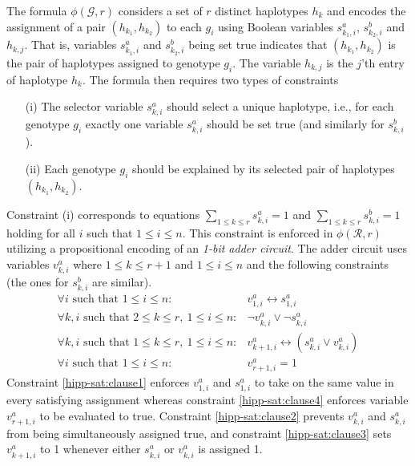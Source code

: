 \documentclass[12pt,a4paper]{article}
\begin{document}
The formula $\phi (\mathcal{G}, r)$ considers a set of $r$ distinct haplotypes $h_k$ and encodes the assignment of a pair $(h_{k_1}, h_{k_2})$ to each $g_i$ using Boolean variables $s^a_{k_1,i}$, $s^b_{k_2,i}$ and $h_{k,j}$.
That is, variables $s^a_{k_1,i}$ and $s^b_{k_2,i}$ being set true indicates that $(h_{k_1}, h_{k_2})$ is the pair of haplotypes assigned to genotype $g_i$.
The variable $h_{k,j}$ is the $j$'th entry of haplotype $h_k$.
The formula then requires two types of constraints
\begin{enumerate}
\item[(i)] The selector variable $s^a_{k,i}$ should select a unique haplotype, i.e., for each genotype $g_i$ exactly one variable $s^a_{k,i}$ should be set true (and similarly for $s^b_{k,i}$). 
\item[(ii)] Each genotype $g_i$ should be explained by its selected pair of haplotypes $(h_{k_1}, h_{k_2})$. 
\end{enumerate}

Constraint (i) corresponds to equations $\sum_{1\leq k\leq r} s^a_{k,i} = 1$ and $\sum_{1\leq k\leq r} s^b_{k,i} = 1$ holding for all $i$ such that $1\leq i \leq n$.
This constraint is enforced in $\phi (\mathcal{R}, r)$ utilizing a propositional encoding of an \emph{1-bit adder circuit}.
The adder circuit uses variables $v^a_{k,i}$ where $1\leq k \leq r+1$ and $1\leq i\leq n$ and the following constraints (the ones for $s^b_{k,i}$ are similar).
\begin{eqnarray}
\forall i\text{ such that } 1\leq i\leq n: & v^a_{1,i} \leftrightarrow s^a_{1,i}\label{hipp-sat:clause1}\\
\forall k, i\text{ such that } 2\leq k \leq r,\ 1\leq i\leq n: & \neg v^a_{k,i} \vee \neg s^a_{k,i}\label{hipp-sat:clause2}\\
\forall k, i\text{ such that } 1\leq k \leq r,\ 1\leq i\leq n: & v^a_{k+1,i} \leftrightarrow (s^a_{k,i}\vee v^a_{k,i} )\label{hipp-sat:clause3}\\
\forall i\text{ such that } 1\leq i\leq n: & v^a_{r+1,i}=1\label{hipp-sat:clause4}
\end{eqnarray}
Constraint \eqref{hipp-sat:clause1} enforces $v^a_{1,i}$ and $s^a_{1,i}$ to take on the same value in every satisfying assignment whereas constraint \eqref{hipp-sat:clause4} enforces variable $v^a_{r+1,i}$ to be evaluated to true.
Constraint \eqref{hipp-sat:clause2} prevents $v^a_{k,i}$ and $s^a_{k,i}$ from being simultaneously assigned true, 
and constraint \eqref{hipp-sat:clause3} sets $v^a_{k+1,i}$ to 1 whenever either $s^a_{k,i}$ or $v^a_{k,i}$ is assigned 1.
\end{document}
